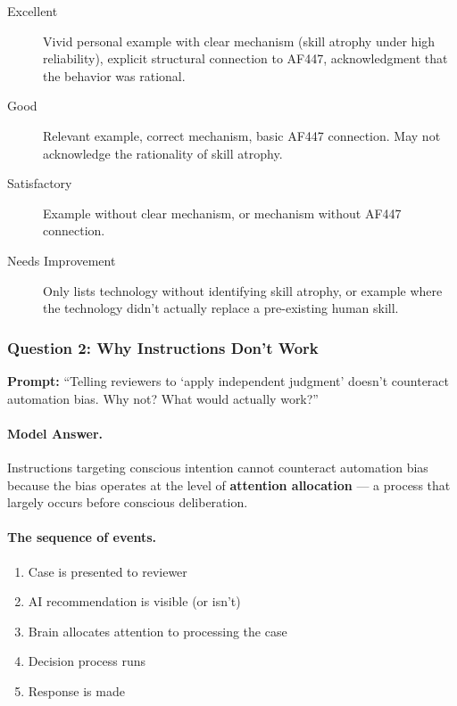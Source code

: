 \begin{description}
    \item[Excellent] Vivid personal example with clear mechanism (skill atrophy under high reliability), explicit structural connection to AF447, acknowledgment that the behavior was rational.

    \item[Good] Relevant example, correct mechanism, basic AF447 connection. May not acknowledge the rationality of skill atrophy.

    \item[Satisfactory] Example without clear mechanism, or mechanism without AF447 connection.

    \item[Needs Improvement] Only lists technology without identifying skill atrophy, or example where the technology didn't actually replace a pre-existing human skill.
\end{description}

\subsubsection{Question 2: Why Instructions Don't Work}

\textbf{Prompt:} ``Telling reviewers to `apply independent judgment' doesn't counteract automation bias. Why not? What would actually work?''

\paragraph{Model Answer.}

Instructions targeting conscious intention cannot counteract automation bias because the bias operates at the level of \textbf{attention allocation} --- a process that largely occurs before conscious deliberation.

\paragraph{The sequence of events.}
\begin{enumerate}
    \item Case is presented to reviewer
    \item AI recommendation is visible (or isn't)
    \item Brain allocates attention to processing the case
    \item Decision process runs
    \item Response is made
\end{enumerate}

